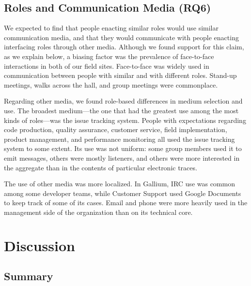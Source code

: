 \documentclass[10pt, conference, compsocconf]{IEEEtran}
\begin{document}
\subsection{Roles and Communication Media (RQ6)}

We expected to find that people enacting similar roles would use similar communication media, and that they would communicate with people enacting interfacing roles through other media. Although we found support for this claim, as we explain below, a biasing factor was the prevalence of face-to-face interactions in both of our field sites. Face-to-face was widely used in communication between people with similar and with different roles. Stand-up meetings, walks across the hall, and group meetings were commonplace.

Regarding other media, we found role-based differences in medium selection and use. The broadest medium---the one that had the greatest use among the most kinds of roles---was the issue tracking system. People with expectations regarding code production, quality assurance, customer service, field implementation, product management, and performance monitoring all used the issue tracking system to some extent. Its use was not uniform: some group members used it to emit messages, others were mostly listeners, and others were more interested in the aggregate than in the contents of particular electronic traces.


The use of other media was more localized. In Gallium, IRC use was common among some developer teams, while Customer Support used Google Documents to keep track of some of its cases. Email and phone were more heavily used in the management side of the organization than on its technical core.




\section{Discussion}

\subsection{Summary}
\end{document}

